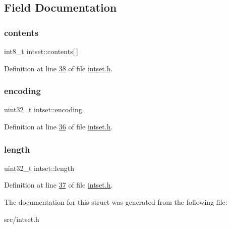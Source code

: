 \subsection{Field Documentation}
\mbox{\label{structintset_a8bb8c906b07afb5e998f92830dcc7e0b}} 
\subsubsection{\texorpdfstring{contents}{contents}}
{\footnotesize\ttfamily int8\+\_\+t intset\+::contents\mbox{[}$\,$\mbox{]}}



Definition at line \hyperlink{intset_8h_source_l00038}{38} of file \hyperlink{intset_8h_source}{intset.\+h}.

\mbox{\label{structintset_a3ca6cf191674fddca8f0dfb4f5b95e93}} 
\subsubsection{\texorpdfstring{encoding}{encoding}}
{\footnotesize\ttfamily uint32\+\_\+t intset\+::encoding}



Definition at line \hyperlink{intset_8h_source_l00036}{36} of file \hyperlink{intset_8h_source}{intset.\+h}.

\mbox{\label{structintset_ad66dd457f30a392c772e4b33bb257c9e}} 
\subsubsection{\texorpdfstring{length}{length}}
{\footnotesize\ttfamily uint32\+\_\+t intset\+::length}



Definition at line \hyperlink{intset_8h_source_l00037}{37} of file \hyperlink{intset_8h_source}{intset.\+h}.



The documentation for this struct was generated from the following file\+:\begin{DoxyCompactItemize}
\item 
src/intset.\+h\end{DoxyCompactItemize}
